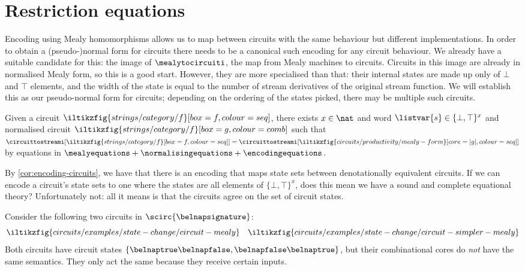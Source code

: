 \section{Restriction equations}\label{sec:restriction}

Encoding using Mealy homomorphisms allows us to map between circuits with the
same behaviour but different implementations.
In order to obtain a (pseudo-)normal form for circuits there needs to be a
canonical such encoding for any circuit behaviour.
We already have a suitable candidate for this: the image of
\(\mealytocircuiti\), the map from Mealy machines to circuits.
Circuits in this image are already in normalised Mealy form, so this is a good
start.
However, they are more specialised than that: their internal states are made up
only of \(\bot\) and \(\top\) elements, and the width of the state is equal to
the number of stream derivatives of the original stream function.
We will establish this as our pseudo-normal form for circuits; depending on the
ordering of the states picked, there may be multiple such circuits.

\begin{corollary}
    Given a circuit \(
    \iltikzfig{strings/category/f}[box=f,colour=seq]
    \), there exists \(x \in \nat\) and word \(\listvar{s} \in \{\bot,\top\}^x\)
    and normalised circuit \(
    \iltikzfig{strings/category/f}[box=g,colour=comb]
    \) such that \(
    \circuittostreami[\iltikzfig{strings/category/f}[box=f,colour=seq]]
    =
    \circuittostreami[\iltikzfig{circuits/productivity/mealy-form}[core=|g|,colour=seq]]
    \) by equations in \(
    \mealyequations + \normalisingequations + \encodingequations
    \).
\end{corollary}

By \cref{cor:encoding-circuits}, we have that there is an encoding that maps
state sets between denotationally equivalent circuits.
If we can encode a circuit's state sets to one where the states are all elements
of \(\{\bot,\top\}^x\), does this mean we have a sound and complete equational
theory?
Unfortunately not: all it means is that the circuits agree on the set of
circuit states.

\begin{example}\label{ex:restriction-example}
    Consider the following two circuits in \(\scirc{\belnapsignature}\): \[
        \iltikzfig{circuits/examples/state-change/circuit-mealy}
        \quad
        \iltikzfig{circuits/examples/state-change/circuit-simpler-mealy}
    \]
    Both circuits have circuit states \(
    \{\belnaptrue\belnapfalse,\belnapfalse\belnaptrue\}
    \), but their combinational cores do \emph{not} have the same semantics.
    They only act the same because they receive certain inputs.
\end{example}

